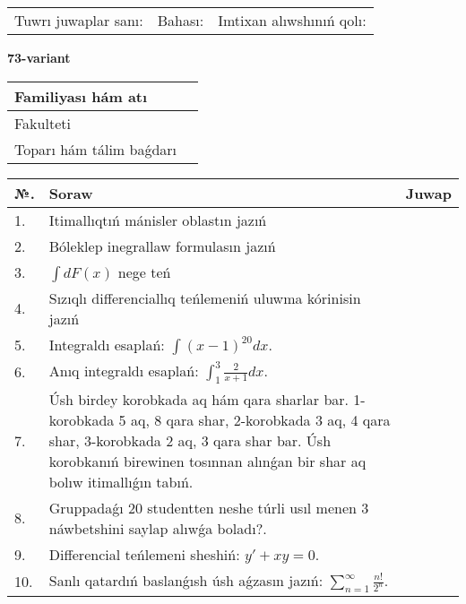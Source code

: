 \documentclass{article}
\begin{document}
\vspace{1cm}

\begin{tabular}{ c c c }
Tuwrı juwaplar sanı: \underline{\hspace{2cm}} & Bahası: \underline{\hspace{2cm}} & Imtixan alıwshınıń qolı: \underline{\hspace{2cm}} \\
\end{tabular}

\newpage

\begin{center}\textbf{73-variant}\end{center}

\bgroup
\def\arraystretch{1.5}
\begin{tabular}{ |m{6cm}|m{10cm}| }
  \hline
  Familiyası hám atı & \\
  \hline
  Fakulteti &\\
  \hline
  Toparı hám tálim baǵdarı & \\
  \hline
\end{tabular}
\egroup

\vspace{0.5cm}

\bgroup
\def\arraystretch{2}
\begin{tabular}{ |l|m{8cm}|m{7cm}| }
  \hline
  №. & Soraw & Juwap \\
  \hline
  1. & Itimallıqtıń mánisler oblastın jazıń &  \\
  \hline
  2. & Bóleklep inegrallaw formulasın jazıń &  \\
  \hline
  3. & $\displaystyle\int dF(x)$ nege teń &  \\
  \hline
  4. & Sızıqlı differenciallıq teńlemeniń uluwma kórinisin jazıń &  \\
  \hline
  5. & Integraldı esaplań: $\displaystyle\int (x - 1)^{20}dx$. &  \\
  \hline
  6. & Anıq integraldı esaplań: $\displaystyle\int_{1}^{3}{\frac{2}{x + 1}dx}$. &  \\
  \hline
  7. & Úsh birdey korobkada aq hám qara sharlar bar. 1-korobkada 5 aq, 8 qara shar, 2-korobkada 3 aq, 4 qara shar, 3-korobkada 2 aq, 3 qara shar bar. Úsh korobkanıń birewinen tosınnan alınǵan bir shar aq bolıw itimallıǵın tabıń. &  \\
  \hline
  8. & Gruppadaǵı 20 studentten neshe túrli usıl menen 3 náwbetshini saylap alıwǵa boladı?. &  \\
  \hline
  9. & Differencial teńlemeni sheshiń: $y' + xy = 0$. &  \\
  \hline
  10. & Sanlı qatardıń baslanǵısh úsh aǵzasın jazıń: $\displaystyle\sum_{n = 1}^{\infty}\frac{n!}{2^{n}}$. &  \\
  \hline
\end{tabular}
\egroup
\end{document}
